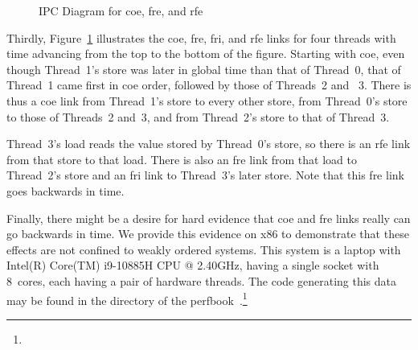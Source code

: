 \documentclass[10]{article}
\begin{document}
\begin{figure}[tb]
\begin{center}
\caption{IPC Diagram for coe, fre, and rfe}
\label{fig:IPC Diagram for coe, fre, and rfe}
\end{center}
\end{figure}

Thirdly, Figure~\ref{fig:IPC Diagram for coe, fre, and rfe} illustrates
the coe, fre, fri, and rfe links for four threads with time advancing
from the top to the bottom of the figure.  Starting with coe, even though
Thread~1's store was later in global time than that of Thread~0, that of
Thread~1 came first in coe order, followed by those of Threads~2 and ~3.
There is thus a coe link from Thread~1's store to every other store,
from Thread~0's store to those of Threads~2 and~3, and from Thread~2's
store to that of Thread~3.

Thread~3's load reads the value stored by Thread~0's store, so there is
an rfe link from that store to that load.  There is also an fre link from
that load to Thread~2's store and an fri link to Thread~3's later store.
Note that this fre link goes backwards in time.

Finally, there might be a desire for hard evidence that coe and fre
links really can go backwards in time.
We provide this evidence on x86 to demonstrate that these effects
are not confined to weakly ordered systems.
This system is a laptop with Intel(R) Core(TM) i9-10885H CPU @ 2.40GHz,
having a single socket with 8~cores, each having a pair of hardware
threads.
The code generating this data may be found in the 
directory of the
perfbook~\cite{McKenney2018ParallelProgramming-2018-12-08a}.\footnote{
	}
\end{document}
